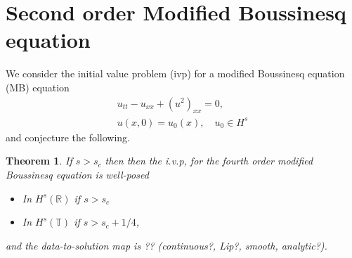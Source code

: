 \documentclass[12pt,reqno]{amsart}
\numberwithin{equation}{section}  %
\numberwithin{figure}{section}
\newcommand{\rr}{\mathbb{R}}
\newcommand{\ci}{\mathbb{T}}
\newtheorem{theorem}{Theorem}[section]
\begin{document}
 
 
        \section{Second order Modified Boussinesq  equation}
        \label{sec:intro}
        We consider the initial value problem (ivp) for a modified Boussinesq
        equation (MB) equation 
        \begin{gather}
          u_{tt} - u_{xx} + (u^2)_{xx} = 0,
          \label{eqn:mb}
          \\
          u(x,0) = u_{0}(x), \quad u_{0} \in H^{s}
          \label{eqn:mb-init-data}
        \end{gather}
        and conjecture the following.
        \begin{theorem}
        If $s>s_c$ then then the  i.v.p, for the fourth order modified
        Boussinesq  equation is well-posed
        \begin{itemize}
          \item In $H^s(\rr)$ if $s > s_c$
          \item In $H^{s}(\ci)$ if $s > s_c + 1/4$,
          \end{itemize}
          and the data-to-solution map is  ?? (continuous?, Lip?, smooth, analytic?). 
        \label{thm:wp}
        \end{theorem}
        
\end{document}
